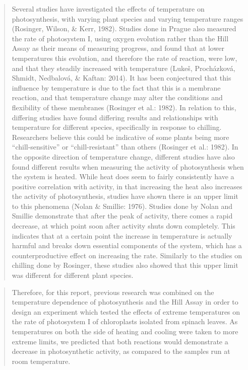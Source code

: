 \documentclass[
]{book}
\begin{document}
\begin{quote}
Several studies have investigated the effects of temperature on photosynthesis, with varying plant species and varying temperature ranges (Rosinger, Wilson, \& Kerr, 1982). Studies done in Prague also measured the rate of photosystem I, using oxygen evolution rather than the Hill Assay as their means of measuring progress, and found that at lower temperatures this evolution, and therefore the rate of reaction, were low, and that they steadily increased with temperature (Lukeš, Procházková, Shmidt, Nedbalová, \& Kaftan: 2014). It has been conjectured that this influence by temperature is due to the fact that this is a membrane reaction, and that temperature change may alter the conditions and flexibility of these membranes (Rosinger et al.: 1982). In relation to this, differing studies have found differing results and relationships with temperature for different species, specifically in response to chilling. Researchers believe this could be indicative of some plants being more ``chill-sensitive'' or ``chill-resistant'' than others (Rosinger et al.: 1982). In the opposite direction of temperature change, different studies have also found different results when measuring the activity of photosynthesis when the system is heated. While heat does seem to fairly consistently have a positive correlation with activity, in that increasing the heat also increases the activity of photosynthesis, studies have shown there is an upper limit to this phenomena (Nolan \& Smillie: 1976). Studies done by Nolan and Smillie demonstrate that after the peak of activity, there comes a rapid decrease, at which point soon after activity shuts down completely. This indicates that at a certain point the increase in temperature is actually harmful and breaks down essential components of the system, which has a counterproductive effect on increasing the rate. Similarly to the studies on chilling done by Rosinger, these studies also showed that this upper limit was different for different plant species.
\end{quote}

\begin{quote}
Therefore, for this report, previous research was combined on the temperature dependence of photosynthesis and the Hill Assay in order to design an experiment which tested the effects of extreme temperatures on the rate of photosystem I of chloroplasts isolated from spinach leaves. As temperatures on both the side of heating and cooling were taken to more extreme limits, we predicted that both reactions would demonstrate a decrease in photosynthetic activity, as compared to the samples run at room temperature.
\end{quote}
\end{document}
